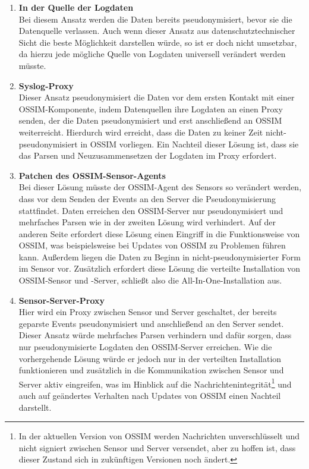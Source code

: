 \begin{enumerate}

\item \textbf{In der Quelle der Logdaten}\\
  Bei diesem Ansatz werden die Daten bereits pseudonymisiert, bevor sie die Datenquelle verlassen. Auch wenn dieser Ansatz aus datenschutztechnischer Sicht die beste Möglichkeit darstellen würde, so ist er doch nicht umsetzbar, da hierzu jede mögliche Quelle von Logdaten universell verändert werden müsste.

\item \textbf{Syslog-Proxy}\\
  Dieser Ansatz pseudonymisiert die Daten vor dem ersten Kontakt mit einer OSSIM-Komponente, indem Datenquellen ihre Logdaten an einen Proxy senden, der die Daten pseudonymisiert und erst anschließend an OSSIM weiterreicht. Hierdurch wird erreicht, dass die Daten zu keiner Zeit nicht-pseudonymisiert in OSSIM vorliegen. Ein Nachteil dieser Lösung ist, dass sie das Parsen und Neuzusammensetzen der Logdaten im Proxy erfordert. 

\item \textbf{Patchen des OSSIM-Sensor-Agents}\\
  Bei dieser Lösung müsste der OSSIM-Agent des Sensors so verändert werden, dass vor dem Senden der Events an den Server die Pseudonymisierung stattfindet. Daten erreichen den OSSIM-Server nur pseudonymisiert und mehrfaches Parsen wie in der zweiten Lösung wird verhindert. Auf der anderen Seite erfordert diese Lösung einen Eingriff in die Funktionsweise von OSSIM, was beispielsweise bei Updates von OSSIM zu Problemen führen kann. Außerdem liegen die Daten zu Beginn in nicht-pseudonymisierter Form im Sensor vor.  Zusätzlich erfordert diese Lösung die verteilte Installation von OSSIM-Sensor und -Server, schließt also die All-In-One-Installation aus.
  
\item \textbf{Sensor-Server-Proxy}\\
  Hier wird ein Proxy zwischen Sensor und Server geschaltet, der bereits geparste Events pseudonymisiert und anschließend an den Server sendet. Dieser Ansatz würde mehrfaches Parsen verhindern und dafür sorgen, dass nur pseudonymisierte Logdaten den OSSIM-Server erreichen. Wie die vorhergehende Lösung würde er jedoch nur in der verteilten Installation funktionieren und zusätzlich in die Kommunikation zwischen Sensor und Server aktiv eingreifen, was im Hinblick auf die Nachrichtenintegrität\footnote{
    In der aktuellen Version von OSSIM werden Nachrichten unverschlüsselt und nicht signiert zwischen Sensor und Server versendet, aber zu hoffen ist, dass dieser Zustand sich in zukünftigen Versionen noch ändert.
  } und auch auf geändertes Verhalten nach Updates von OSSIM einen Nachteil darstellt.
  

\end{enumerate}
